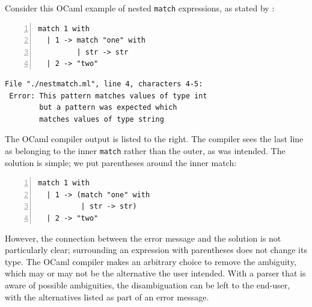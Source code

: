 \documentclass[runningheads]{llncs}
\newcommand{\ocaml}{\lstinline[language={[objective]caml}]}
\begin{document}
Consider this OCaml example of nested \verb|match| expressions, as stated by \cite{palmkvistCreatingDomainSpecificLanguages2019}:

\begin{minipage}{.34\textwidth}
\begin{lstlisting}[language={[objective]caml},numbers=left,basicstyle=\small\tt]
match 1 with
  | 1 -> match "one" with
         | str -> str
  | 2 -> "two"
\end{lstlisting}
\end{minipage}
\vrule
\begin{minipage}{\textwidth}
\begin{lstlisting}[basicstyle=\small\tt]
 File "./nestmatch.ml", line 4, characters 4-5:
 Error: This pattern matches values of type int
        but a pattern was expected which
        matches values of type string
\end{lstlisting}
\end{minipage}


\noindent The OCaml compiler output is listed to the right. The compiler sees the last line as belonging to the inner \ocaml{match} rather than the outer, as was intended. The solution is simple; we put parentheses around the inner match:

\begin{minipage}{\textwidth}
\begin{lstlisting}[language={[objective]caml},numbers=left,basicstyle=\small\tt]
match 1 with
  | 1 -> (match "one" with
          | str -> str)
  | 2 -> "two"
\end{lstlisting}
\end{minipage}

\noindent However, the connection between the error message and the solution is not particularly clear; surrounding an expression with parentheses does not change its type.
%
%
%
%
%
%
The OCaml compiler makes an arbitrary choice to remove the ambiguity, which may or may not be the alternative the user intended. With a parser that is aware of possible ambiguities, the disambiguation can be left to the end-user, with the alternatives listed as part of an error message.
\end{document}
